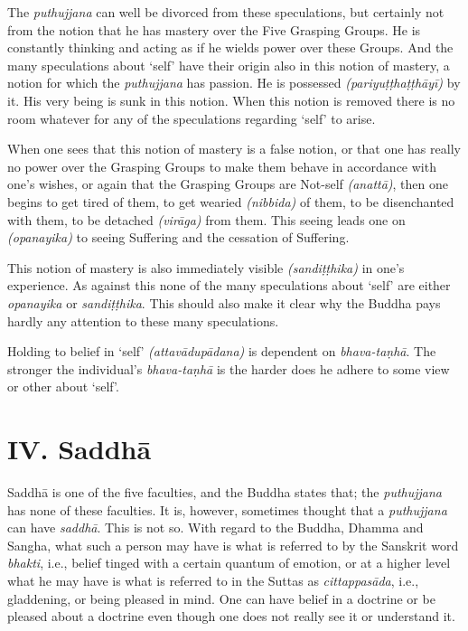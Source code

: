 The \emph{puthujjana} can well be divorced from these speculations, but certainly not from the notion that he has mastery over the Five Grasping Groups. He is constantly thinking and acting as if he wields power over these Groups. And the many speculations about `self' have their origin also in this notion of mastery, a notion for which the \emph{puthujjana} has passion. He is possessed \emph{(pariyuṭṭhaṭṭhāyī)} by it. His very being is sunk in this notion. When this notion is removed there is no room whatever for any of the speculations regarding `self' to arise.

When one sees that this notion of mastery is a false notion, or that one has really no power over the Grasping Groups to make them behave in accordance with one's wishes, or again that the Grasping Groups are Not-self \emph{(anattā)}, then one begins to get tired of them, to get wearied \emph{(nibbida)} of them, to be disenchanted with them, to be detached \emph{(virāga)} from them. This seeing leads one on \emph{(opanayika)} to seeing Suffering and the cessation of Suffering.

This notion of mastery is also immediately visible \emph{(sandiṭṭhika)} in one's experience. As against this none of the many speculations about `self' are either \emph{opanayika} or \emph{sandiṭṭhika}. This should also make it clear why the Buddha pays hardly any attention to these many speculations.

Holding to belief in `self' \emph{(attavādupādana)} is dependent on \emph{bhava-taṇhā}. The stronger the individual's \emph{bhava-taṇhā} is the harder does he adhere to some view or other about `self'.

\section{IV. Saddhā}

Saddhā is one of the five faculties, and the Buddha states that; the \emph{puthujjana} has none of these faculties. It is, however, sometimes thought that a \emph{puthujjana} can have \emph{saddhā}. This is not so. With regard to the Buddha, Dhamma and Sangha, what such a person may have is what is referred to by the Sanskrit word \emph{bhakti}, i.e., belief tinged with a certain quantum of emotion, or at a higher level what he may have is what is referred to in the Suttas as \emph{cittappasāda}, i.e., gladdening, or being pleased in mind. One can have belief in a doctrine or be pleased about a doctrine even though one does not really see it or understand it.

